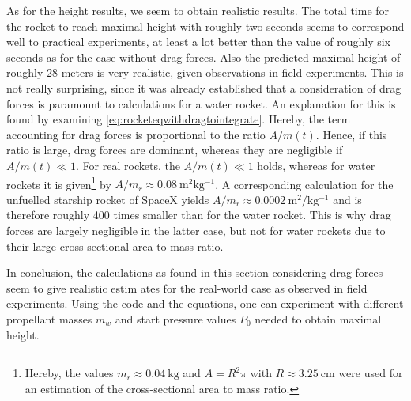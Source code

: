 \documentclass[a4paper,11pt]{report}
\begin{document}
As for the height results, we seem to obtain realistic results. The total time for the rocket to reach maximal height with roughly two seconds seems to correspond well to practical experiments, at least a lot better than the value of roughly six seconds as for the case without drag forces. Also the predicted maximal height of roughly 28 meters is very realistic, given observations in field experiments. This is not really surprising, since it was already established that a consideration of drag forces is paramount to calculations for a water rocket. An explanation for this is found by examining \cref{eq:rocketeqwithdragtointegrate}. Hereby, the term accounting for drag forces is proportional to the ratio $A/m(t)$. Hence, if this ratio is large, drag forces are dominant, whereas they are negligible if $A/m(t) \ll 1$. For real rockets, the $A/m(t) \ll 1$ holds, whereas for water rockets it is given\footnote{Hereby, the values $m_r \approx \SI{0.04}{\kilogram}$ and $A = R^2\pi$ with $R \approx \SI{3.25}{\centi\meter}$ were used for an estimation of the cross-sectional area to mass ratio.} by $A/m_r \approx \SI{0.08}{\meter^2\kilogram^{-1}}$. A corresponding calculation for the unfuelled starship rocket of SpaceX yields $A/m_r \approx \SI{0.0002}{\meter^2/\kilogram^{-1}}$ and is therefore roughly 400 times smaller than for the water rocket. This is why drag forces are largely negligible in the latter case, but not for water rockets due to their large cross-sectional area to mass ratio.

In conclusion, the calculations as found in this section considering drag forces seem to give realistic estim
ates for the real-world case as observed in field experiments. Using the code and the equations, one can experiment with different propellant masses $m_w$ and start pressure values $P_0$ needed to obtain maximal height.

\appendix
\end{document}
